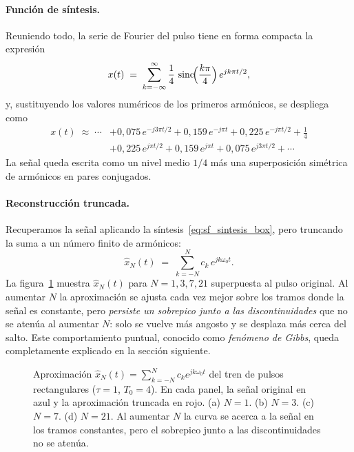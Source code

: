 \documentclass[class=book, crop=false]{standalone}
\begin{document}
\paragraph{Función de síntesis.}
Reuniendo todo, la serie de Fourier del pulso tiene en forma
compacta la expresión
\begin{equation*}
    x(t) \;=\; \sum_{k=-\infty}^{\infty}
        \frac{1}{4}\,\operatorname{sinc}\!\Bigl(\frac{k\pi}{4}\Bigr)
        \,e^{j k \pi t/2},
\end{equation*}
y, sustituyendo los valores numéricos de los primeros armónicos,
se despliega como
\begin{align*}
    x(t) \;\approx\; \cdots
        & + 0{,}075\,e^{-j 3\pi t/2}
        + 0{,}159\,e^{-j\pi t}
        + 0{,}225\,e^{-j\pi t/2}
        + \tfrac{1}{4} \\
        & + 0{,}225\,e^{j\pi t/2}
        + 0{,}159\,e^{j\pi t}
        + 0{,}075\,e^{j 3\pi t/2}
        + \cdots
\end{align*}
La señal queda escrita como un nivel medio $1/4$ más una
superposición simétrica de armónicos en pares conjugados.

\paragraph{Reconstrucción truncada.}
Recuperamos la señal aplicando la síntesis~\eqref{eq:sf_sintesis_box},
pero truncando la suma a un número finito de armónicos:
\begin{equation*}
    \hat{x}_N(t) \;=\; \sum_{k=-N}^{N} c_k\,e^{jk\omega_0 t}.
\end{equation*}
La figura~\ref{fig:pulso_reconstruccion} muestra $\hat{x}_N(t)$ para
$N = 1, 3, 7, 21$ superpuesta al pulso original. Al aumentar $N$ la
aproximación se ajusta cada vez mejor sobre los tramos donde la señal
es constante, pero \emph{persiste un sobrepico junto a las
discontinuidades} que no se atenúa al aumentar $N$: solo se vuelve más
angosto y se desplaza más cerca del salto. Este comportamiento
puntual, conocido como \emph{fenómeno de Gibbs}, queda completamente
explicado en la sección siguiente.

\begin{figure}[H]
    \centering
    \begin{minipage}{\linewidth}
        \centering
        
        \caption{Aproximación $\hat{x}_N(t) = \sum_{k=-N}^{N} c_k
                 e^{jk\omega_0 t}$ del tren de pulsos rectangulares
                 ($\tau = 1$, $T_0 = 4$). En cada panel, la señal
                 original en azul y la aproximación truncada en rojo.
                 (a) $N = 1$. (b) $N = 3$. (c) $N = 7$. (d) $N = 21$.
                 Al aumentar $N$ la curva se acerca a la señal en los
                 tramos constantes, pero el sobrepico junto a las
                 discontinuidades no se atenúa.}
        \label{fig:pulso_reconstruccion}
    \end{minipage}
\end{figure}
\end{document}

